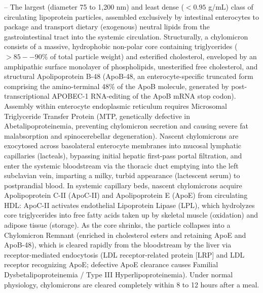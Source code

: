 -- The largest (diameter 75 to 1,200 nm) and least dense ($<0.95$ g/mL) class of circulating lipoprotein particles, assembled exclusively by intestinal enterocytes to package and transport dietary (exogenous) neutral lipids from the gastrointestinal tract into the systemic circulation. Structurally, a chylomicron consists of a massive, hydrophobic non-polar core containing triglycerides ($>85--90\%$ of total particle weight) and esterified cholesterol, enveloped by an amphipathic surface monolayer of phospholipids, unesterified free cholesterol, and structural Apolipoprotein B-48 (ApoB-48, an enterocyte-specific truncated form comprising the amino-terminal 48\% of the ApoB molecule, generated by post-transcriptional APOBEC-1 RNA-editing of the ApoB mRNA stop codon). Assembly within enterocyte endoplasmic reticulum requires Microsomal Triglyceride Transfer Protein (MTP, genetically defective in Abetalipoproteinemia, preventing chylomicron secretion and causing severe fat malabsorption and spinocerebellar degeneration). Nascent chylomicrons are exocytosed across basolateral enterocyte membranes into mucosal lymphatic capillaries (lacteals), bypassing initial hepatic first-pass portal filtration, and enter the systemic bloodstream via the thoracic duct emptying into the left subclavian vein, imparting a milky, turbid appearance (lactescent serum) to postprandial blood. In systemic capillary beds, nascent chylomicrons acquire Apolipoprotein C-II (ApoC-II) and Apolipoprotein E (ApoE) from circulating HDL: ApoC-II activates endothelial Lipoprotein Lipase (LPL), which hydrolyzes core triglycerides into free fatty acids taken up by skeletal muscle (oxidation) and adipose tissue (storage). As the core shrinks, the particle collapses into a Chylomicron Remnant (enriched in cholesterol esters and retaining ApoE and ApoB-48), which is cleared rapidly from the bloodstream by the liver via receptor-mediated endocytosis (LDL receptor-related protein [LRP] and LDL receptor recognizing ApoE; defective ApoE clearance causes Familial Dysbetalipoproteinemia / Type III Hyperlipoproteinemia). Under normal physiology, chylomicrons are cleared completely within 8 to 12 hours after a meal.

